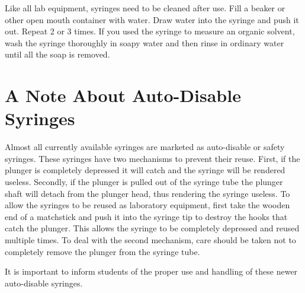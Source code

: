 Like all lab equipment, syringes need to be cleaned after use. Fill a beaker or other open mouth container with water. Draw water into the syringe and push it out. Repeat 2 or 3 times. If you used the syringe to measure an organic solvent, wash the syringe thoroughly in soapy water and then rinse in ordinary water until all the soap is removed.

\section{A Note About Auto-Disable Syringes}

Almost all currently available syringes are marketed as auto-disable or safety syringes. These syringes have two mechanisms to prevent their reuse. First, if the plunger is completely depressed it will catch and the syringe will be rendered useless. Secondly, if the plunger is pulled out of the syringe tube the plunger shaft will detach from the plunger head, thus rendering the syringe useless. To allow the syringes to be reused as laboratory equipment, first take the wooden end of a matchstick and push it into the syringe tip to destroy the hooks that catch the plunger. This allows the syringe to be completely depressed and reused multiple times. To deal with the second mechanism, care should be taken not to completely remove the plunger from the syringe tube.

It is important to inform students of the proper use and handling of these newer auto-disable syringes.

